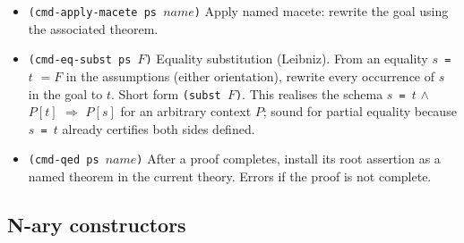 \begin{itemize}
\item \texttt{(cmd-apply-macete ps $\mathit{name}$)}
  Apply named macete: rewrite the goal using the associated theorem.

\item \begin{sloppypar}\texttt{(cmd-eq-subst ps $F$)}
  Equality substitution (Leibniz).  From an equality \texttt{$s$ = $t$} $= F$
  in the assumptions (either orientation), rewrite every occurrence of $s$
  in the goal to $t$.  Short form \texttt{(subst $F$)}.  This realises the
  schema \texttt{$s$ = $t$} $\wedge$ \texttt{$P[t]$} $\Rightarrow$
  \texttt{$P[s]$} for an arbitrary context $P$; sound for partial equality
  because \texttt{$s$ = $t$} already certifies both sides
  defined.\end{sloppypar}

\item \texttt{(cmd-qed ps $\mathit{name}$)}
  After a proof completes, install its root assertion as a named theorem
  in the current theory.  Errors if the proof is not complete.

\end{itemize}

\subsection{N-ary constructors}
\label{sec:nary-proof-commands}

